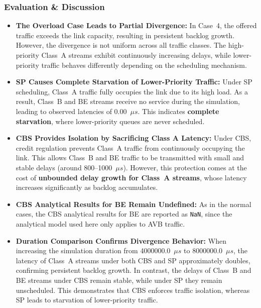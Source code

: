 \subsubsection{Evaluation \& Discussion}

\begin{itemize}

\item \textbf{The Overload Case Leads to Partial Divergence:}
In Case~4, the offered traffic exceeds the link capacity, resulting in persistent backlog growth. However, the divergence is not uniform across all traffic classes. The high-priority Class~A streams exhibit continuously increasing delays, while lower-priority traffic behaves differently depending on the scheduling mechanism.

\item \textbf{SP Causes Complete Starvation of Lower-Priority Traffic:}
Under SP scheduling, Class~A traffic fully occupies the link due to its high load. As a result, Class~B and BE streams receive no service during the simulation, leading to observed latencies of 0.00~$\mu s$. This indicates \textbf{complete starvation}, where lower-priority queues are never scheduled.

\item \textbf{CBS Provides Isolation by Sacrificing Class A Latency:}
Under CBS, credit regulation prevents Class~A traffic from continuously occupying the link. This allows Class~B and BE traffic to be transmitted with small and stable delays (around 800--1000~$\mu s$). However, this protection comes at the cost of \textbf{unbounded delay growth for Class~A streams}, whose latency increases significantly as backlog accumulates.

\item \textbf{CBS Analytical Results for BE Remain Undefined:}
As in the normal cases, the CBS analytical results for BE are reported as \texttt{NaN}, since the analytical model used here only applies to AVB traffic.

\item \textbf{Duration Comparison Confirms Divergence Behavior:}
When increasing the simulation duration from 4000000.0~$\mu s$ to 8000000.0~$\mu s$, the latency of Class~A streams under both CBS and SP approximately doubles, confirming persistent backlog growth. In contrast, the delays of Class~B and BE streams under CBS remain stable, while under SP they remain unscheduled. This demonstrates that CBS enforces traffic isolation, whereas SP leads to starvation of lower-priority traffic.

\end{itemize}

